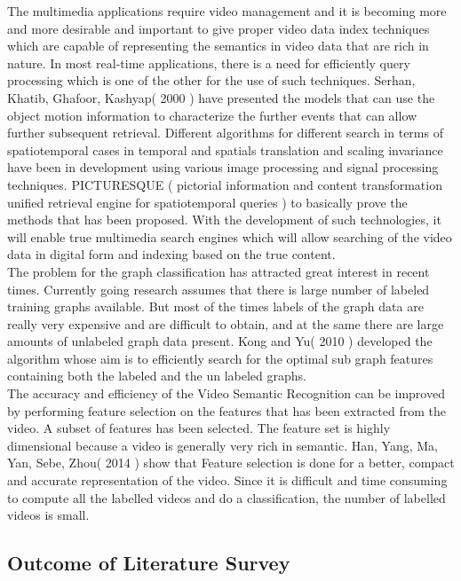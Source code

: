 \documentclass[a4paper,12pt]{article}
\begin{document}
The multimedia applications require video management and it is becoming more and more desirable and important to give proper video data index techniques which are capable of representing the semantics in video data that are rich in nature. In most real-time applications, there is a need for efficiently query processing which is one of the other for the use of such techniques. Serhan, Khatib, Ghafoor, Kashyap( 2000 ) have presented the models that can use the object motion information to characterize the further events that can allow further subsequent retrieval. Different algorithms for different search in terms of spatiotemporal cases in temporal and spatials translation and scaling invariance have been in development using various image processing and signal processing techniques. PICTURESQUE ( pictorial information and content transformation unified retrieval engine for spatiotemporal queries ) to basically prove the methods that has been proposed. With the development of such technologies, it will enable true multimedia search engines which will allow searching of the video data in digital form and indexing based on the true content.\\
The problem for the graph classification has attracted great interest in recent times. Currently going research assumes that there is large number of labeled training graphs available. But most of the times labels of the graph data are really very expensive and are difficult to obtain, and at the same there are large amounts of unlabeled graph data present. Kong and Yu( 2010 ) developed the algorithm whose aim is to efficiently search for the optimal sub graph features containing both the labeled and the un labeled graphs.
\\
 The accuracy and efficiency of the Video Semantic Recognition can be improved by performing feature selection on the features that has been extracted from the video. A subset of features has been selected. The feature set is highly dimensional because a video is generally very rich in semantic. Han, Yang, Ma, Yan, Sebe, Zhou( 2014 ) show that Feature selection is done for a better, compact and accurate representation of the video. Since it is difficult and time consuming to compute all the labelled videos and do a classification, the number of labelled videos is small.
 \\
\subsection{ Outcome of Literature Survey}
\end{document}
